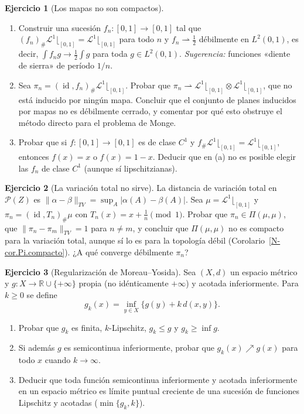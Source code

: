 \documentclass[11pt,a4paper]{amsart}
\newcounter{chapter}
\newcommand{\id}{\operatorname{id}}
\newcommand{\R}{{\mathbb R}}
\newcommand{\LL}{{\mathcal L}}
\theoremstyle{remark}
\theoremstyle{definition}
\newtheorem{ejercicio}{Ejercicio}[chapter]
\numberwithin{subsection}{section}
\numberwithin{equation}{section}
\begin{document}
\begin{ejercicio}[Los mapas no son compactos]\label{ejer.mapas.no.compactos}
\leavevmode
\begin{enumerate}[label=(\alph*)]
\item Construir una sucesión $f_n\colon[0,1]\to[0,1]$ tal que
$(f_n)_\#\LL^1\lfloor_{[0,1]}=\LL^1\lfloor_{[0,1]}$ para todo $n$ y
$f_n\rightharpoonup\frac12$ débilmente en $L^2(0,1)$, es decir,
$\int f_n g\to\frac12\int g$ para toda $g\in L^2(0,1)$.
\emph{Sugerencia:} funciones «diente de sierra» de período $1/n$.
\item Sea $\pi_n=(\id,f_n)_\#\LL^1\lfloor_{[0,1]}$. Probar que
$\pi_n\rightharpoonup\LL^1\lfloor_{[0,1]}\otimes\LL^1\lfloor_{[0,1]}$, que no
está inducido por ningún mapa. Concluir que el conjunto de planes inducidos
por mapas no es débilmente cerrado, y comentar por qué esto obstruye el
método directo para el problema de Monge.
\item Probar que si $f\colon[0,1]\to[0,1]$ es de clase $C^1$ y
$f_\#\LL^1\lfloor_{[0,1]}=\LL^1\lfloor_{[0,1]}$, entonces $f(x)=x$ o
$f(x)=1-x$. Deducir que en (a) no es posible elegir las $f_n$ de clase $C^1$
(aunque sí lipschitzianas).
\end{enumerate}
\end{ejercicio}

\begin{ejercicio}[La variación total no sirve]\label{ejer.variacion.total}
La distancia de variación total en $\mathcal P(Z)$ es
$\|\alpha-\beta\|_{TV}=\sup_{A}|\alpha(A)-\beta(A)|$. Sea
$\mu=\LL^1\lfloor_{[0,1]}$ y $\pi_n=(\id,T_n)_\#\mu$ con
$T_n(x)=x+\frac1n \pmod 1$. Probar que $\pi_n\in\Pi(\mu,\mu)$, que
$\|\pi_n-\pi_m\|_{TV}=1$ para $n\ne m$, y concluir que $\Pi(\mu,\mu)$ no es
compacto para la variación total, aunque sí lo es para la topología débil
(Corolario~\ref{N-cor.Pi.compacto}). ¿A qué converge débilmente $\pi_n$?
\end{ejercicio}

\begin{ejercicio}[Regularización de Moreau--Yosida]\label{ejer.moreau.yosida}
Sea $(X,d)$ un espacio métrico y $g\colon X\to\R\cup\{+\infty\}$ propia
(no idénticamente $+\infty$) y acotada inferiormente. Para $k\ge0$ se define
\[
g_k(x)=\inf_{y\in X}\bigl\{g(y)+k\,d(x,y)\bigr\}.
\]
\begin{enumerate}[label=(\alph*)]
\item Probar que $g_k$ es finita, $k$-Lipschitz, $g_k\le g$ y $g_k\ge\inf g$.
\item Si además $g$ es semicontinua inferiormente, probar que $g_k(x)\nearrow g(x)$
para todo $x$ cuando $k\to\infty$.
\item Deducir que toda función semicontinua inferiormente y acotada
inferiormente en un espacio métrico es límite puntual creciente de una
sucesión de funciones Lipschitz y acotadas ($\min\{g_k,k\}$).
\end{enumerate}
\end{ejercicio}
\end{document}
